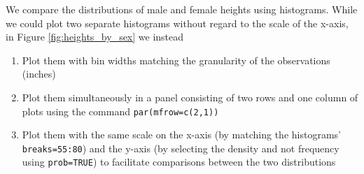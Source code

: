 \documentclass{article}\usepackage[]{graphicx}\usepackage[]{color}
\begin{document}
We compare the distributions of male and female heights using histograms.  While we could plot two separate histograms without regard to the scale of the x-axis, in Figure \ref{fig:heights_by_sex} we instead

\begin{enumerate}
\item Plot them with bin widths matching the granularity of the observations (inches)
\item Plot them simultaneously in a panel consisting of two rows and one column of plots using the command \verb#par(mfrow=c(2,1))#
\item Plot them with the same scale on the x-axis (by matching the histograms' \verb#breaks=55:80#) and the y-axis (by selecting the density and not frequency using \verb#prob=TRUE#) to facilitate comparisons between the two distributions
\end{enumerate}
\end{document}
